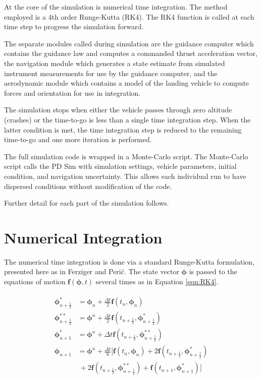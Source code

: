 At the core of the simulation is numerical time integration. The method employed is a 4th order Runge-Kutta (RK4). The RK4 function is called at each time step to progress the simulation forward.

The separate modules called during simulation are the guidance computer which contains the guidance law and computes a commanded thrust acceleration vector, the navigation module which generates a state estimate from simulated instrument measurements for use by the guidance computer, and the aerodynamic module which contains a model of the landing vehicle to compute forces and orientation for use in integration.

The simulation stops when either the vehicle passes through zero altitude (crashes) or the time-to-go is less than a single time integration step. When the latter condition is met, the time integration step is reduced to the remaining time-to-go and one more iteration is performed.

The full simulation code is wrapped in a Monte-Carlo script. The Monte-Carlo script calls the PD Sim with simulation settings, vehicle parameters, initial condition, and navigation uncertainty. This allows each individual run to have dispersed conditions without modification of the code.

Further detail for each part of the simulation follows.

\section{Numerical Integration}
The numerical time integration is done via a standard Runge-Kutta formulation, presented here as in Ferziger and Peri\'c\:\cite{FERZIGER}. The state vector $\bm{\phi}$ is passed to the equations of motion $\bm{f}(\bm{\phi},t)$ several times as in Equation \ref{eqn:RK4}.

\begin{align}
\label{eqn:RK4}
\begin{split}
\bm{\phi}_{n+\frac{1}{2}}^* &= \bm{\phi}_n + \frac{\Delta t}{2} \bm{f}(t_n,\bm{\phi}_n)\\
\bm{\phi}_{n+\frac{1}{2}}^{**} &= \bm{\phi}^n + \frac{\Delta t}{2}  \bm{f}(t_{n+\frac{1}{2}},\bm{\phi}^*_{n+\frac{1}{2}})\\
\bm{\phi}_{n+1}^* &= \bm{\phi}^n + \Delta t  \bm{f}(t_{n+\frac{1}{2}},\bm{\phi}^{**}_{n+\frac{1}{2}})\\
\bm{\phi}_{n+1} &= \bm{\phi}^n + \frac{\Delta t}{6}
[\bm{f}(t_n,\bm{\phi}_{n})
+ 2\bm{f}(t_{n+\frac{1}{2}},\bm{\phi}^*_{n+\frac{1}{2}})\\
&\:+ 2\bm{f}(t_{n+\frac{1}{2}},\bm{\phi}^{**}_{n+\frac{1}{2}})
+ \bm{f}(t_{n+1},\bm{\phi}_{n+1}^*)]
\end{split}
\end{align}


